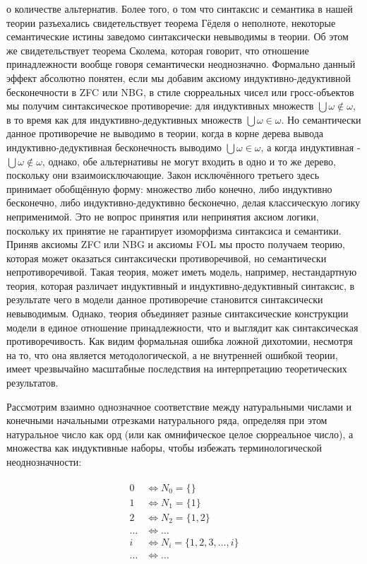 \documentclass[12pt]{article}
\begin{document}
о количестве альтернатив. Более того, о том что синтаксис и семантика в нашей теории разъехались свидетельствует теорема Гёделя о неполноте, некоторые семантические истины заведомо синтаксически невыводимы в теории. Об этом же свидетельствует теорема Сколема, которая говорит, что отношение принадлежности вообще говоря семантически неоднозначно. Формально данный эффект абсолютно понятен, если мы добавим аксиому индуктивно-дедуктивной бесконечности в ZFC или NBG, в стиле сюрреальных чисел или гросс-объектов мы получим синтаксическое противоречие: для индуктивных множеств $\bigcup \omega \notin \omega$, в то время как для индуктивно-дедуктивных множеств $\bigcup \omega \in \omega$. Но семантически данное противоречие не выводимо в теории, когда в корне дерева вывода индуктивно-дедуктивная бесконечность выводимо $\bigcup \omega \in \omega$, а когда индуктивная - $\bigcup \omega \notin \omega$, однако, обе альтернативы не могут входить в одно и то же дерево, поскольку они взаимоисключающие. Закон исключённого третьего здесь принимает обобщённую форму: множество либо конечно, либо индуктивно бесконечно, либо индуктивно-дедуктивно бесконечно, делая классическую логику неприменимой. Это не вопрос принятия или непринятия аксиом логики, поскольку их принятие не гарантирует изоморфизма синтаксиса и семантики. Приняв аксиомы ZFC или NBG и аксиомы FOL мы просто получаем теорию, которая может оказаться синтаксически противоречивой, но семантически непротиворечивой. Такая теория, может иметь модель, например, нестандартную теория, которая различает индуктивный и индуктивно-дедуктивный синтаксис, в результате чего в модели данное противоречие становится синтаксически невыводимым. Однако, теория объединяет разные синтаксические конструкции модели в единое отношение принадлежности, что и выглядит как синтаксическая противоречивость. Как видим формальная ошибка ложной дихотомии, несмотря на то, что она является методологической, а не внутренней ошибкой теории, имеет чрезвычайно масштабные последствия на интерпретацию теоретических результатов.

Рассмотрим взаимно однозначное соответствие между натуральными числами и конечными начальными отрезками натурального ряда, определяя при этом натуральное число как орд (или как омнифическое целое сюрреальное число), а множества как индуктивные наборы, чтобы избежать терминологической неоднозначности:

\begin{align}
\begin{split}
0 &\Leftrightarrow N_0 = \{\}\\
1 &\Leftrightarrow N_1 = \{1\}\\
2 &\Leftrightarrow N_2 = \{1, 2\}\\
\dots &\Leftrightarrow \dots\\
i &\Leftrightarrow N_i = \{1, 2, 3, \dots, i\}\\
\dots &\Leftrightarrow \dots
\end{split}
\end{align}
\end{document}
